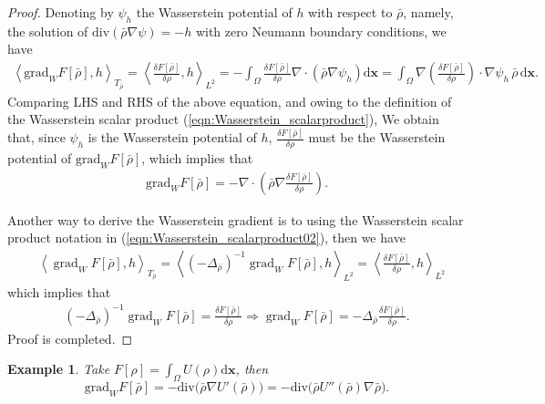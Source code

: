 \documentclass[11pt]{book}
\newtheorem{example}[theorem]{Example}
\newcommand{\grad}{\operatorname{grad}}
\newcommand{\dx}{\mathrm{d}\mathbf{x}}
\begin{document}
\begin{proof}
Denoting by \( \psi_h \) the Wasserstein potential of $h$ with respect to $\bar{\rho}$, namely, the solution of \( \text{div}(\bar{\rho} \nabla \psi) = -h \) with zero Neumann boundary conditions, we have
\begin{align*}
    \left\langle \text{grad}_{W} F[\bar{\rho}], h \right\rangle_{T_{\bar{\rho}}}
    = \left\langle \frac{\delta F[\bar{\rho}]}{\delta \rho}, h \right\rangle_{L^2}
    = -\int_\Omega \frac{\delta F[\bar{\rho}]}{\delta \rho} \nabla\cdot(\bar{\rho} \nabla \psi_h) \dx
    = \int_\Omega \nabla \left( \frac{\delta F[\bar{\rho}]}{\delta \rho} \right) \cdot \nabla \psi_h \, \bar{\rho} \, \dx.
\end{align*}
Comparing LHS and RHS of the above equation, and owing to the definition of the Wasserstein scalar product (\ref{eqn:Wasserstein_scalarproduct}), We obtain that, since $\psi_h$ is the Wasserstein potential of $h$,  $\frac{\delta F[\bar{\rho}]}{\delta \rho}$ must be the Wasserstein potential of $\text{grad}_{W} F[\bar{\rho}]$, which implies that
\begin{align*}
    \text{grad}_{W} F[\bar{\rho}] = -\nabla \cdot \left( \bar{\rho} \nabla \frac{\delta F[\bar{\rho}]}{\delta \rho} \right).
\end{align*}

Another way to derive the Wasserstein gradient is to using the Wasserstein scalar product notation in (\ref{eqn:Wasserstein_scalarproduct02}),  then we have
\begin{align*}
    &\left\langle \grad_{W} F[\bar{\rho}], h \right\rangle_{T_{\bar{\rho}}}
    = \left\langle (-\Delta_{\bar{\rho}})^{-1} \grad_{W} F[\bar{\rho}], h \right\rangle_{L^2}
    = \left\langle \frac{\delta F[\bar{\rho}]}{\delta \rho}, h \right\rangle_{L^2}
\end{align*}
which implies that
\begin{align*}
  (-\Delta_{\bar{\rho}})^{-1} \grad_{W} F[\bar{\rho}] = \frac{\delta F[\bar{\rho}]}{\delta \rho} 
    \Longrightarrow  \grad_{W} F[\bar{\rho}] = -\Delta_{\bar{\rho}} \frac{\delta F[\bar{\rho}]}{\delta \rho}.
\end{align*}
Proof is completed.
\end{proof}

\begin{example}
Take $F[\rho] = \int_{\Omega} U(\rho) \dx$, then
\[
\mathrm{grad}_{W} F[\bar{\rho}] = -\mathrm{div} \big( \bar{\rho} \nabla U'(\bar{\rho}) \big) 
= -\mathrm{div} \big( \bar{\rho} U''(\bar{\rho}) \nabla \bar{\rho} \big).
\]
\end{example}
\end{document}
